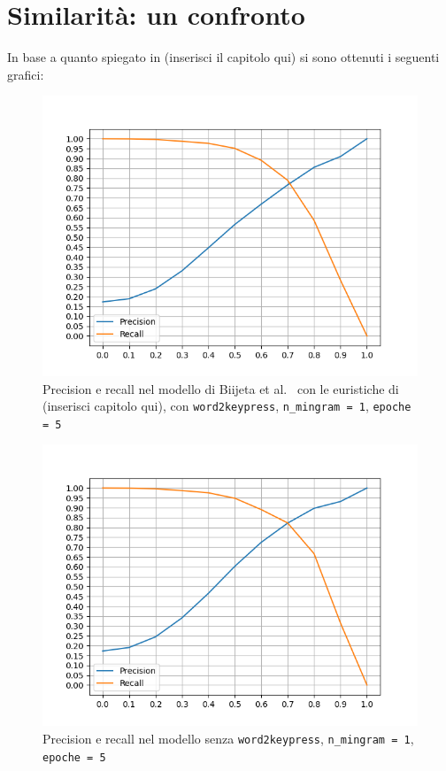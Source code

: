 \section{Similarità: un confronto}
In base a quanto spiegato in (inserisci il capitolo qui) si sono ottenuti i seguenti grafici:
\begin{figure}[H]
    \centering
    \includegraphics[width=14cm]{./immagini/CORRETTO_w2kp_nmingram=1_epochs=5.png}
    \caption{Precision e recall nel modello di Biijeta et al.~\cite{biijeta} con le euristiche di (inserisci capitolo qui), con \texttt{word2keypress}, \texttt{n\_mingram = 1}, \texttt{epoche = 5}}
    \label{primomodello}
\end{figure}
\begin{figure}[H]
    \centering
    \includegraphics[width=14cm]{./immagini/no_w2kp_nmingram=1_epochs=5.png}
    \caption{Precision e recall nel modello senza \texttt{word2keypress}, \texttt{n\_mingram = 1}, \texttt{epoche = 5}}
    \label{secondomodello}
\end{figure}

